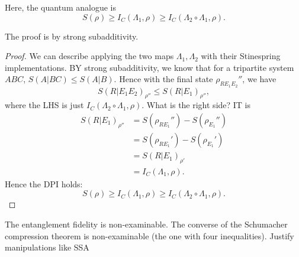 Here, the quantum analogue is
\begin{equation}
    S(\rho)\geq I_C(\Lambda_1,\rho) \geq I_C(\Lambda_2 \circ \Lambda_1,\rho).
\end{equation}

The proof is by strong subadditivity.
\begin{proof}
    We can describe applying the two maps $\Lambda_1,\Lambda_2$ with their Stinespring implementations. BY strong subadditivity, we know that for a tripartite system $ABC$, $S(A|BC)\leq S(A|B)$. Hence with the final state $\rho_{RE_1E_2}''$, we have
    \begin{equation}
        S(R|E_1E_2)_{\rho''}\leq S(R|E_1)_{\rho''},
    \end{equation}
    where the LHS is just $I_C(\Lambda_2 \circ \Lambda_1, \rho)$. What is the right side? IT is
    \begin{align*}
        S(R|E_1)_{\rho''} &= S(\rho_{RE_1}'') -S(\rho_{E_1}'')\\
            &=S(\rho_{RE_1}')-S(\rho_{E_1}')\\
            &=S(R|E_1)_{\rho'}\\
            &= I_C(\Lambda_1,\rho).
    \end{align*}
    Hence the DPI holds:
    \begin{equation}
        S(\rho) \geq I_C(\Lambda_1,\rho) \geq I_C(\Lambda_2 \circ \Lambda_1,\rho).
    \end{equation}
\end{proof}
The entanglement fidelity is non-examinable. The converse of the Schumacher compression theorem is non-examinable (the one with four inequalities). Justify manipulations like SSA